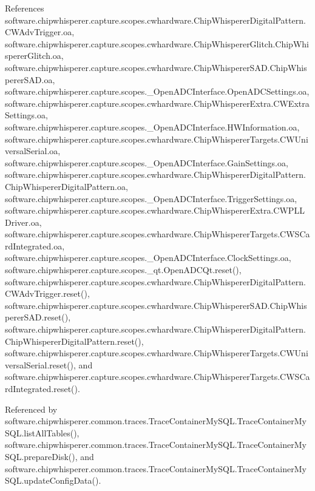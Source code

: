 References software.\+chipwhisperer.\+capture.\+scopes.\+cwhardware.\+Chip\+Whisperer\+Digital\+Pattern.\+C\+W\+Adv\+Trigger.\+oa, software.\+chipwhisperer.\+capture.\+scopes.\+cwhardware.\+Chip\+Whisperer\+Glitch.\+Chip\+Whisperer\+Glitch.\+oa, software.\+chipwhisperer.\+capture.\+scopes.\+cwhardware.\+Chip\+Whisperer\+S\+A\+D.\+Chip\+Whisperer\+S\+A\+D.\+oa, software.\+chipwhisperer.\+capture.\+scopes.\+\_\+\+Open\+A\+D\+C\+Interface.\+Open\+A\+D\+C\+Settings.\+oa, software.\+chipwhisperer.\+capture.\+scopes.\+cwhardware.\+Chip\+Whisperer\+Extra.\+C\+W\+Extra\+Settings.\+oa, software.\+chipwhisperer.\+capture.\+scopes.\+\_\+\+Open\+A\+D\+C\+Interface.\+H\+W\+Information.\+oa, software.\+chipwhisperer.\+capture.\+scopes.\+cwhardware.\+Chip\+Whisperer\+Targets.\+C\+W\+Universal\+Serial.\+oa, software.\+chipwhisperer.\+capture.\+scopes.\+\_\+\+Open\+A\+D\+C\+Interface.\+Gain\+Settings.\+oa, software.\+chipwhisperer.\+capture.\+scopes.\+cwhardware.\+Chip\+Whisperer\+Digital\+Pattern.\+Chip\+Whisperer\+Digital\+Pattern.\+oa, software.\+chipwhisperer.\+capture.\+scopes.\+\_\+\+Open\+A\+D\+C\+Interface.\+Trigger\+Settings.\+oa, software.\+chipwhisperer.\+capture.\+scopes.\+cwhardware.\+Chip\+Whisperer\+Extra.\+C\+W\+P\+L\+L\+Driver.\+oa, software.\+chipwhisperer.\+capture.\+scopes.\+cwhardware.\+Chip\+Whisperer\+Targets.\+C\+W\+S\+Card\+Integrated.\+oa, software.\+chipwhisperer.\+capture.\+scopes.\+\_\+\+Open\+A\+D\+C\+Interface.\+Clock\+Settings.\+oa, software.\+chipwhisperer.\+capture.\+scopes.\+\_\+qt.\+Open\+A\+D\+C\+Qt.\+reset(), software.\+chipwhisperer.\+capture.\+scopes.\+cwhardware.\+Chip\+Whisperer\+Digital\+Pattern.\+C\+W\+Adv\+Trigger.\+reset(), software.\+chipwhisperer.\+capture.\+scopes.\+cwhardware.\+Chip\+Whisperer\+S\+A\+D.\+Chip\+Whisperer\+S\+A\+D.\+reset(), software.\+chipwhisperer.\+capture.\+scopes.\+cwhardware.\+Chip\+Whisperer\+Digital\+Pattern.\+Chip\+Whisperer\+Digital\+Pattern.\+reset(), software.\+chipwhisperer.\+capture.\+scopes.\+cwhardware.\+Chip\+Whisperer\+Targets.\+C\+W\+Universal\+Serial.\+reset(), and software.\+chipwhisperer.\+capture.\+scopes.\+cwhardware.\+Chip\+Whisperer\+Targets.\+C\+W\+S\+Card\+Integrated.\+reset().



Referenced by software.\+chipwhisperer.\+common.\+traces.\+Trace\+Container\+My\+S\+Q\+L.\+Trace\+Container\+My\+S\+Q\+L.\+list\+All\+Tables(), software.\+chipwhisperer.\+common.\+traces.\+Trace\+Container\+My\+S\+Q\+L.\+Trace\+Container\+My\+S\+Q\+L.\+prepare\+Disk(), and software.\+chipwhisperer.\+common.\+traces.\+Trace\+Container\+My\+S\+Q\+L.\+Trace\+Container\+My\+S\+Q\+L.\+update\+Config\+Data().


